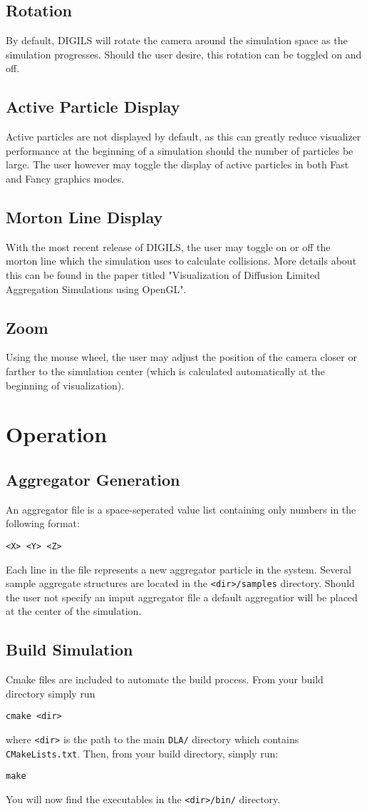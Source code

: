 \documentclass[fleqn,10pt]{UserGuideArx} %
\begin{document}
\subsection{Rotation}
By default, DIGILS will rotate the camera around the simulation space as the simulation progresses. Should the user desire, this rotation can be toggled on and off.

\subsection{Active Particle Display}
Active particles are not displayed by default, as this can greatly reduce visualizer performance at the beginning of a simulation should the number of particles be large. The user however may toggle the display of active particles in both Fast and Fancy graphics modes.
\subsection{Morton Line Display}
With the most recent release of DIGILS, the user may toggle on or off the morton line which the simulation uses to calculate collisions. More details about this can be found in the paper titled "Visualization of Diffusion Limited Aggregation Simulations using OpenGL".
\subsection{Zoom}
Using the mouse wheel, the user may adjust the position of the camera closer or farther to the simulation center (which is calculated automatically at the beginning of visualization).
\section{Operation}
\subsection{Aggregator Generation}
An aggregator file is a space-seperated value list containing only numbers in the following format:
\begin{center}
    \texttt{<X> <Y> <Z>}
\end{center}
Each line in the file represents a new aggregator particle in the system. Several sample aggregate structures are located in the \texttt{<dir>/samples} directory. Should the user not specify an imput aggregator file a default aggregatior will be placed at the center of the simulation.
\subsection{Build Simulation}
Cmake files are included to automate the build process. From your build directory simply run
\begin{center}
    \texttt{cmake <dir>}
\end{center}
where \texttt{<dir>} is the path to the main \texttt{DLA/} directory which contains \texttt{CMakeLists.txt}.
Then, from your build directory, simply run:
\begin{center}
    \texttt{make}
\end{center}
You will now find the executables in the \texttt{<dir>/bin/} directory.
\end{document}
